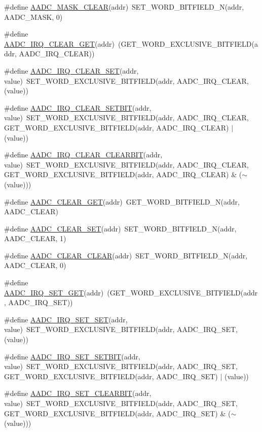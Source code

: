 \begin{DoxyCompactItemize}
\#define \hyperlink{a00542_a093845be9c28c1096d689d0581f07040}{AADC\_\-MASK\_\-CLEAR}(addr)~SET\_\-WORD\_\-BITFIELD\_\-N(addr, AADC\_\-MASK, 0)
\item 
\#define \hyperlink{a00542_a07d953bfbd05693c3d62c8f20652459c}{AADC\_\-IRQ\_\-CLEAR\_\-GET}(addr)~(GET\_\-WORD\_\-EXCLUSIVE\_\-BITFIELD(addr, AADC\_\-IRQ\_\-CLEAR))
\item 
\#define \hyperlink{a00542_a277df8dc6b41f771ad1fbca4727e378c}{AADC\_\-IRQ\_\-CLEAR\_\-SET}(addr, value)~SET\_\-WORD\_\-EXCLUSIVE\_\-BITFIELD(addr, AADC\_\-IRQ\_\-CLEAR, (value))
\item 
\#define \hyperlink{a00542_aa7f8084ae0f54732ecaba3caa99869b9}{AADC\_\-IRQ\_\-CLEAR\_\-SETBIT}(addr, value)~SET\_\-WORD\_\-EXCLUSIVE\_\-BITFIELD(addr, AADC\_\-IRQ\_\-CLEAR, GET\_\-WORD\_\-EXCLUSIVE\_\-BITFIELD(addr, AADC\_\-IRQ\_\-CLEAR) $|$ (value))
\item 
\#define \hyperlink{a00542_afcf05fb8abebe232d0e6aa01db7ec0a4}{AADC\_\-IRQ\_\-CLEAR\_\-CLEARBIT}(addr, value)~SET\_\-WORD\_\-EXCLUSIVE\_\-BITFIELD(addr, AADC\_\-IRQ\_\-CLEAR, GET\_\-WORD\_\-EXCLUSIVE\_\-BITFIELD(addr, AADC\_\-IRQ\_\-CLEAR) \& ($\sim$(value)))
\item 
\#define \hyperlink{a00542_a5abec0a591a921238ff2a7112805a15a}{AADC\_\-CLEAR\_\-GET}(addr)~GET\_\-WORD\_\-BITFIELD\_\-N(addr, AADC\_\-CLEAR)
\item 
\#define \hyperlink{a00542_a2e3c052c7ce2d327ac3392df35a5a6b7}{AADC\_\-CLEAR\_\-SET}(addr)~SET\_\-WORD\_\-BITFIELD\_\-N(addr, AADC\_\-CLEAR, 1)
\item 
\#define \hyperlink{a00542_a99c4f6e7bc87ceb2815d4e1cb27ebf38}{AADC\_\-CLEAR\_\-CLEAR}(addr)~SET\_\-WORD\_\-BITFIELD\_\-N(addr, AADC\_\-CLEAR, 0)
\item 
\#define \hyperlink{a00542_a54a06f630db322d82aa48766ddb3a9bd}{AADC\_\-IRQ\_\-SET\_\-GET}(addr)~(GET\_\-WORD\_\-EXCLUSIVE\_\-BITFIELD(addr, AADC\_\-IRQ\_\-SET))
\item 
\#define \hyperlink{a00542_a23071f081f4c750db61915fcbac68cff}{AADC\_\-IRQ\_\-SET\_\-SET}(addr, value)~SET\_\-WORD\_\-EXCLUSIVE\_\-BITFIELD(addr, AADC\_\-IRQ\_\-SET, (value))
\item 
\#define \hyperlink{a00542_a1ec6ce0853a4117a93ffae6f0f8b6227}{AADC\_\-IRQ\_\-SET\_\-SETBIT}(addr, value)~SET\_\-WORD\_\-EXCLUSIVE\_\-BITFIELD(addr, AADC\_\-IRQ\_\-SET, GET\_\-WORD\_\-EXCLUSIVE\_\-BITFIELD(addr, AADC\_\-IRQ\_\-SET) $|$ (value))
\item 
\#define \hyperlink{a00542_a68452084e782d8e7b77f33b21fbb431b}{AADC\_\-IRQ\_\-SET\_\-CLEARBIT}(addr, value)~SET\_\-WORD\_\-EXCLUSIVE\_\-BITFIELD(addr, AADC\_\-IRQ\_\-SET, GET\_\-WORD\_\-EXCLUSIVE\_\-BITFIELD(addr, AADC\_\-IRQ\_\-SET) \& ($\sim$(value)))

\end{DoxyCompactItemize}
